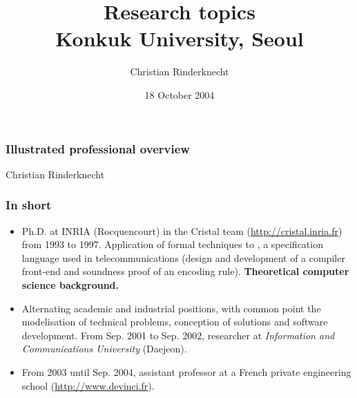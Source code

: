 \documentclass[compress,dvips,xcolor={dvipsnames},t]{beamer}
\title{Research topics\\
Konkuk University, Seoul}
\author{Christian Rinderknecht}
\date{18 October 2004}
\begin{document}
\frame{\maketitle}

\begin{frame}
\frametitle{Illustrated professional overview}

\bigskip

\centerline{Christian Rinderknecht}

\end{frame}

%
\begin{frame}
\frametitle{In short}

\begin{itemize}

  \item Ph.D. at INRIA (Rocquencourt) in the Cristal team
  (\url{http://cristal.inria.fr}) from 1993 to 1997. Application of
  formal techniques to \ASN, a specification language used in
  telecommunications (design and development of a compiler front-end
  and soundness proof of an encoding rule). \textbf{Theoretical
  computer science background.}

  \item Alternating academic and industrial positions, with common
  point the modelisation of technical problems, conception of
  solutions and software development. From Sep. 2001 to Sep. 2002,
  researcher at \emph{Information and Communications University}
  (Daejeon).

  \item From 2003 until Sep. 2004, assistant professor at a French
  private engineering school (\url{http://www.devinci.fr}).


\end{itemize}

\end{frame}
\end{document}
